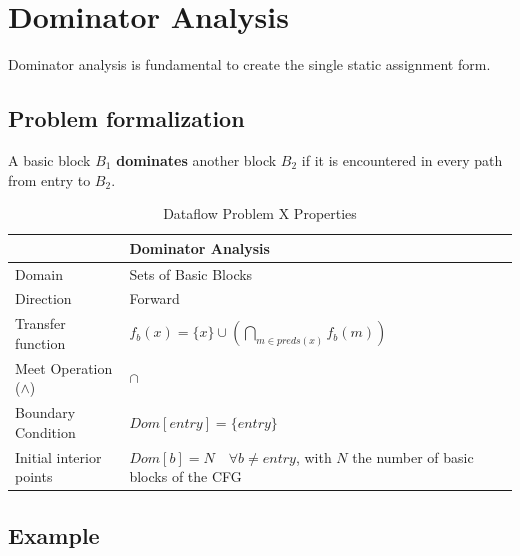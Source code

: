 \documentclass{article}
\begin{document}
\section{Dominator Analysis}

Dominator analysis is fundamental to create the single static assignment form.

\subsection{Problem formalization}

A basic block $B_1$ \textbf{dominates} another block $B_2$ if it is encountered in every path from entry to $B_2$.

\begin{table}[H]
	\centering
	\begin{tabular}{|p{}|p{}|}
		\hline
		                          & \textbf{Dominator Analysis}                                                             \\
		\hline
		Domain                    & Sets of Basic Blocks                                                                    \\
		\hline
		Direction                 & Forward                                                                                 \\
		\hline
		Transfer function         & $f_b(x) = \{x\} \cup (\bigcap_{m \in preds(x)} f_b(m)) $                                \\
		\hline
		Meet Operation ($\wedge$) & $\cap$                                                                                  \\
		\hline
		Boundary Condition        & $Dom[entry] = \{entry\}$                                                                \\
		\hline
		Initial interior points   & $Dom[b] = N \quad \forall b \neq entry$, with $N$ the number of basic blocks of the CFG \\
		\hline
	\end{tabular}
	\caption{Dataflow Problem X Properties}
	\label{tab:dataflow_problem_x}
\end{table}

\subsection{Example}
\end{document}
